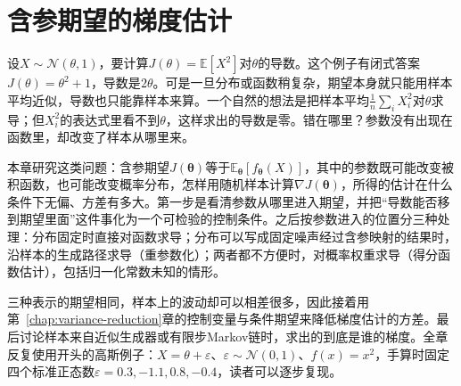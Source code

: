 \chapter{含参期望的梯度估计}
\label{chap:expectation-gradient-estimation}

设$X\sim\mathcal{N}(\theta,1)$，要计算$J(\theta)=\mathbb{E}[X^{2}]$对$\theta$的导数。这个例子有闭式答案$J(\theta)=\theta^{2}+1$，导数是$2\theta$。可是一旦分布或函数稍复杂，期望本身就只能用样本平均近似，导数也只能靠样本来算。一个自然的想法是把样本平均$\frac{1}{n}\sum_{i}X_{i}^{2}$对$\theta$求导；但$X_{i}^{2}$的表达式里看不到$\theta$，这样求出的导数是零。错在哪里？参数没有出现在函数里，却改变了样本从哪里来。

本章研究这类问题：含参期望$J(\bm{\theta})$等于$\mathbb{E}_{\bm{\theta}}[f_{\bm{\theta}}(X)]$，其中的参数既可能改变被积函数，也可能改变概率分布，怎样用随机样本计算$\nabla J(\bm{\theta})$，所得的估计在什么条件下无偏、方差有多大。第一步是看清参数从哪里进入期望，并把“导数能否移到期望里面”这件事化为一个可检验的控制条件。之后按参数进入的位置分三种处理：分布固定时直接对函数求导；分布可以写成固定噪声经过含参映射的结果时，沿样本的生成路径求导（重参数化）；两者都不方便时，对概率权重求导（得分函数估计），包括归一化常数未知的情形。

三种表示的期望相同，样本上的波动却可以相差很多，因此接着用第~\ref{chap:variance-reduction}章的控制变量与条件期望来降低梯度估计的方差。最后讨论样本来自近似生成器或有限步Markov链时，求出的到底是谁的梯度。全章反复使用开头的高斯例子：$X=\theta+\varepsilon$、$\varepsilon\sim\mathcal{N}(0,1)$、$f(x)=x^{2}$，手算时固定四个标准正态数$\varepsilon=0.3,-1.1,0.8,-0.4$，读者可以逐步复现。










